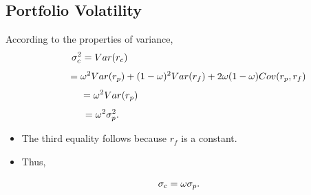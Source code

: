 \documentclass[letterpaper,10pt,english]{sphinxmanual}
\begin{document}
\subsection{Portfolio Volatility}
\label{allocation:portfolio-volatility}
According to the properties of variance,
\begin{gather}
\begin{split}\sigma^2_c = Var(r_c) \qquad \qquad \qquad \qquad \qquad \qquad
\qquad \qquad \enspace\end{split}\notag
\end{gather}\begin{gather}
\begin{split}\quad \enspace \; \, = \omega^2 Var(r_p) + (1 - \omega)^2 Var(r_f) + 2
\omega (1 - \omega) Cov(r_p, r_f)\end{split}\notag
\end{gather}\begin{gather}
\begin{split}= \omega^2 Var(r_p) \qquad \qquad \qquad \qquad \qquad \qquad
\quad \enspace \; \: \,\end{split}\notag
\end{gather}\begin{gather}
\begin{split}= \omega^2 \sigma^2_p. \qquad \qquad \qquad \qquad \qquad \qquad
\qquad \quad \enspace \; \,\end{split}\notag
\end{gather}\begin{itemize}
\item {} 
The third equality follows because $r_f$ is a constant.

\end{itemize}
\begin{itemize}
\item {} 
Thus,

\end{itemize}
\begin{gather}
\begin{split}\sigma_c = \omega \sigma_p.\end{split}\notag
\end{gather}
\end{document}
